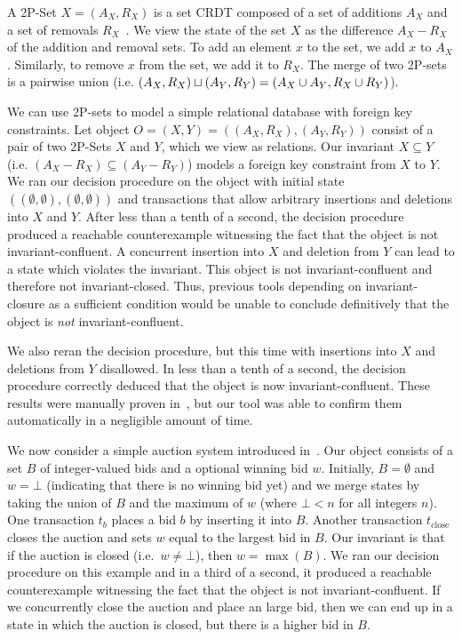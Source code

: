 A 2P-Set $X = (A_X, R_X)$ is a set CRDT composed of a set of additions $A_X$
and a set of removals $R_X$~\cite{shapiro2011comprehensive}. We view the state
of the set $X$ as the difference $A_X - R_X$ of the addition and removal sets.
To add an element $x$ to the set, we add $x$ to $A_X$. Similarly, to remove $x$
from the set, we add it to $R_X$. The merge of two 2P-sets is a pairwise union
(i.e. $(A_X, R_X) \sqcup (A_Y, R_Y) = (A_X \cup A_Y, R_X \cup R_Y)$).

We can use 2P-sets to model a simple relational database with foreign key
constraints. Let object $O = (X, Y) = ((A_X, R_X), (A_Y, R_Y))$ consist of a
pair of two 2P-Sets $X$ and $Y$, which we view as relations. Our invariant $X
\subseteq Y$ (i.e. $(A_X - R_X) \subseteq (A_Y - R_Y)$) models a foreign key
constraint from $X$ to $Y$. We ran our decision procedure on the object with
initial state $((\emptyset, \emptyset), (\emptyset, \emptyset))$ and
transactions that allow arbitrary insertions and deletions into $X$ and $Y$.
After less than a tenth of a second, the decision procedure produced a
reachable counterexample witnessing the fact that the object is not
invariant-confluent. A concurrent insertion into $X$ and deletion from $Y$ can
lead to a state which violates the invariant. This object is not
invariant-confluent and therefore not invariant-closed. Thus, previous tools
depending on invariant-closure as a sufficient condition would be unable to
conclude definitively that the object is \emph{not} invariant-confluent.

We also reran the decision procedure, but this time with insertions into $X$
and deletions from $Y$ disallowed. In less than a tenth of a second, the
decision procedure correctly deduced that the object is now
invariant-confluent. These results were manually proven
in~\cite{bailis2014coordination}, but our tool was able to confirm them
automatically in a negligible amount of time.

\example[Auction]
We now consider a simple auction system introduced in~\cite{gotsman2016cause}.
Our object consists of a set $B$ of integer-valued bids and a optional winning
bid $w$. Initially, $B = \emptyset$ and $w = \bot$ (indicating that there is no
winning bid yet) and we merge states by taking the union of $B$ and the maximum
of $w$ (where $\bot < n$ for all integers $n$). One transaction $t_b$ places a bid
$b$ by inserting it into $B$. Another transaction $t_\text{close}$ closes the
auction and sets $w$ equal to the largest bid in $B$. Our invariant is that if
the auction is closed (i.e.\ $w \neq \bot$), then $w = \max(B)$. We ran our
decision procedure on this example and in a third of a second, it produced a
reachable counterexample witnessing the fact that the object is not
invariant-confluent.  If we concurrently close the auction and place an large
bid, then we can end up in a state in which the auction is closed, but there is
a higher bid in $B$.

